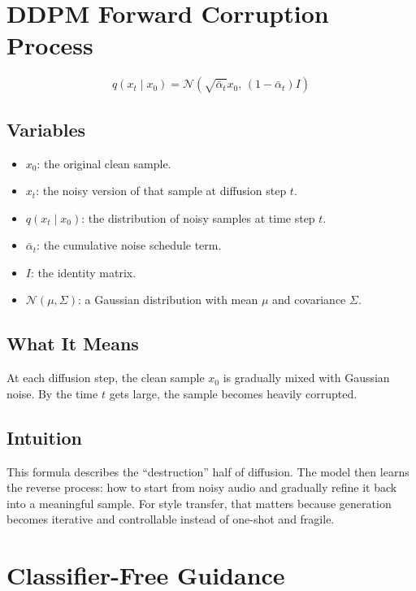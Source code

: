 \documentclass[11pt]{article}
\begin{document}
\section{DDPM Forward Corruption Process}

\begin{equation*}
q(x_t\mid x_0)=\mathcal{N}\!\left(\sqrt{\bar{\alpha}_t}x_0,\,(1-\bar{\alpha}_t)I\right)
\end{equation*}

\subsection*{Variables}
\begin{itemize}
\item \(x_0\): the original clean sample.
\item \(x_t\): the noisy version of that sample at diffusion step \(t\).
\item \(q(x_t\mid x_0)\): the distribution of noisy samples at time step \(t\).
\item \(\bar{\alpha}_t\): the cumulative noise schedule term.
\item \(I\): the identity matrix.
\item \(\mathcal{N}(\mu,\Sigma)\): a Gaussian distribution with mean \(\mu\) and covariance \(\Sigma\).
\end{itemize}

\subsection*{What It Means}
At each diffusion step, the clean sample \(x_0\) is gradually mixed with Gaussian noise. By the time \(t\) gets large, the sample becomes heavily corrupted.

\subsection*{Intuition}
This formula describes the ``destruction'' half of diffusion. The model then learns the reverse process: how to start from noisy audio and gradually refine it back into a meaningful sample. For style transfer, that matters because generation becomes iterative and controllable instead of one-shot and fragile.

\section{Classifier-Free Guidance}
\end{document}
